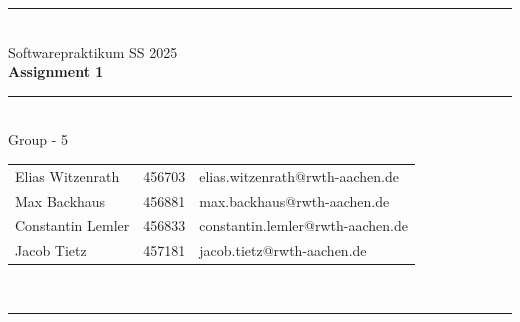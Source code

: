 \documentclass[a4paper,12pt]{article}
\begin{document}
\begin{center}
	\rule{\textwidth}{0.1pt}\\[1cm]
	
	\Large Softwarepraktikum SS 2025\\\bf Assignment 1
\end{center}


\begin{center}

	\rule{\textwidth}{0.1pt}\\[0.5cm]

	{\Large Group - 5\\[5mm]} %

	\begin{tabular}{lll}
		Elias Witzenrath & 456703 & elias.witzenrath@rwth-aachen.de \\

		Max Backhaus & 456881 & max.backhaus@rwth-aachen.de \\

		Constantin Lemler & 456833 & constantin.lemler@rwth-aachen.de \\

        Jacob Tietz & 457181 & jacob.tietz@rwth-aachen.de \\

	\end{tabular}\\[0.5cm]

	\rule{\textwidth}{0.1pt}\\[1cm]

\end{center}








\end{document}
